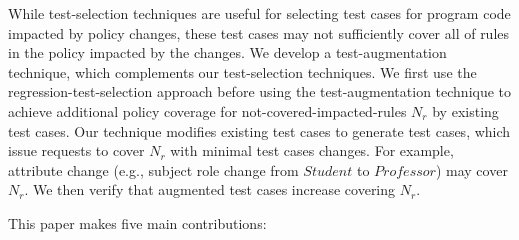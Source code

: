 While test-selection techniques are useful for selecting test cases for program code impacted by policy changes, these test cases may not sufficiently cover all of rules in the policy impacted by the changes.
We develop a test-augmentation technique, which complements our test-selection techniques.
We first use the regression-test-selection approach before using the test-augmentation technique to achieve
additional policy coverage for not-covered-impacted-rules $N_r$ by existing test cases.
Our technique modifies existing test cases to generate test cases, which issue requests to cover $N_r$ with minimal test cases changes. For example, attribute change (e.g., subject role change from $Student$ to $Professor$) may cover $N_r$. We then verify that augmented test cases increase covering $N_r$.





This paper makes five main contributions:

